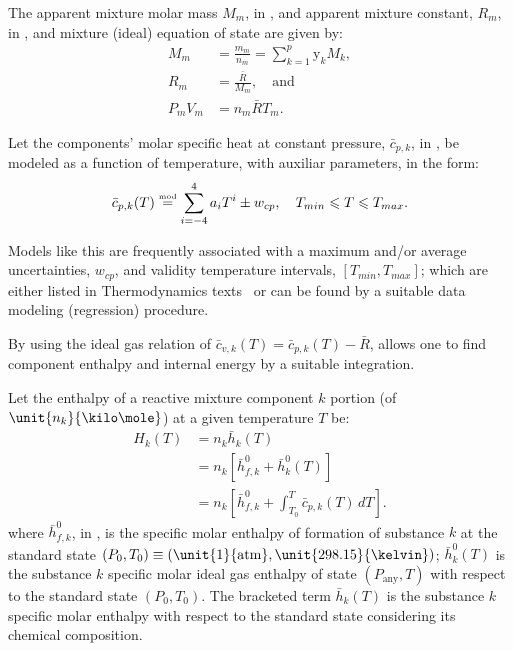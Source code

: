     The  apparent  mixture  molar  mass  $M_m$,  in  \kilogram\per\kilo\mole,  and  apparent   mixture   constant,   $R_m$,   in
    \kilo\joule\per\kilogram\usk\kelvin, and mixture (ideal) equation of state are given by:%
    \begin{align}
        \label{eq:Mm}
        M_m         &= \frac{m_m}{n_m} = \sum_{k=1}^p \mathrm{y}_k M_k, \\
        \label{eq:Rm}
        R_m         &= \frac{\bar{R}}{M_m}, \quad\mbox{and} \\
        \label{eq:mEoS}
        P_mV_m      &= n_m\bar{R}T_m.
    \end{align}

    Let the components' molar specific heat at constant pressure, $\bar{c}_{p,k}$, in  \kilo\joule\per\kilo\mole\usk\kelvin,  be
    modeled as a function of temperature, with auxiliar parameters, in the form:%
    \begin{equation}
        \bar{c}_{p,k}(T) \stackrel{\text{{\tiny mod}}}{=} \sum_{i=-4}^4 a_iT^i \pm w_{cp}, \quad T_{min} \leqslant T \leqslant T_{max}.
        \label{eq:cp}
    \end{equation}

    Models like this are frequently associated with a maximum and/or average uncertainties, $w_{cp}$, and  validity  temperature
    intervals, $[T_{min}, T_{max}]$; which are either  listed  in  Thermodynamics  texts~\cite{2014-CengelYA+BolesMA-McGrawHill,
    1985-WylenG-Wiley} or can be found by a suitable data modeling (regression) procedure.

    By using the ideal gas relation of $\bar{c}_{v,k}(T) = \bar{c}_{p,k}(T) - \bar{R}$, allows one to  find  component  enthalpy
    and internal energy by a suitable integration.

    Let the enthalpy of a reactive mixture component $k$ portion (of $\unit{n_k}{\kilo\mole}$) at a given temperature $T$ be:%
    \begin{align}
        H_k(T)      &= n_k\bar{h}_k(T) \nonumber\\
                    &= n_k[\bar{h}^0_{f,k} + \bar{h}^0_k(T)] \nonumber\\
                    &= n_k\left[
                        \bar{h}^0_{f,k} + \int_{T_0}^T \bar{c}_{p,k}(T)\,dT
                    \right].
        \label{eq:H.comp}
    \end{align}
    \noindent where $\bar{h}^0_{f,k}$, in \kilo\joule\per\kilo\mole, is the specific molar enthalpy of formation of  substance  $k$
    at the standard  state  $(P_0,  T_0)  \equiv  (\unit{1}{\mathrm{atm}},  \unit{298.15}{\kelvin})$;  $\bar{h}^0_k(T)$  is  the
    substance $k$ specific molar ideal gas enthalpy of state $(P_{\mathrm{any}}, T)$ with respect to the standard  state  $(P_0,
    T_0)$. The bracketed term $\bar{h}_k(T)$ is the substance $k$ specific molar enthalpy with respect  to  the  standard  state
    considering its chemical composition.


